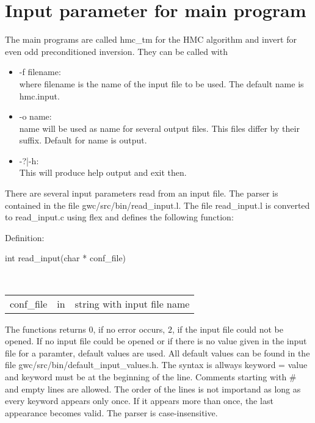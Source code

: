 \section{Input parameter for main program}

The main programs are called {\ttfamily hmc\_tm} for the HMC algorithm
and {\ttfamily invert} for even odd preconditioned inversion. They can
be called with
\begin{itemize}
\item {\ttfamily -f filename}:\\
  where {\ttfamily filename} is the name of the input file to be
  used. The default name is {\ttfamily hmc.input}.

\item {\ttfamily -o name}:\\
  {\ttfamily name} will be used as name for several output files. This
  files differ by their suffix. Default for {\ttfamily name} is
  {\ttfamily output}.

\item {\ttfamily -?|-h}:\\
  This will produce help output and exit then.
  
\end{itemize}

There are several input parameters read from an input file. The parser is contained in the file {\ttfamily gwc/src/bin/read\_input.l}. The file {\ttfamily read\_input.l} is converted to {\ttfamily read\_input.c} using {\ttfamily flex} and defines the following function:

Definition:\\
\begin{ttfamily}
  int read\_input(char * conf\_file)
\end{ttfamily}\\

\begin{tabular}[h]{l l l}
{\ttfamily conf\_file} & in & string with input file name\\ 
\end{tabular}

The functions returns $0$, if no error occurs, $2$, if the input file
could not be opened. If no input file could be opened or if there is
no value given in the input file for a paramter, default values are
used. All default values can be found in the file {\ttfamily
  gwc/src/bin/default\_input\_values.h}. The syntax is allways
{\ttfamily keyword = value} and {\ttfamily keyword} must be at the
beginning of the line. Comments starting with {\ttfamily \#} and empty
lines are allowed. The order of the lines is not importand as long as
every keyword appears only once.  If it appears more than once, the
last appearance becomes valid. The parser is case-insensitive.

